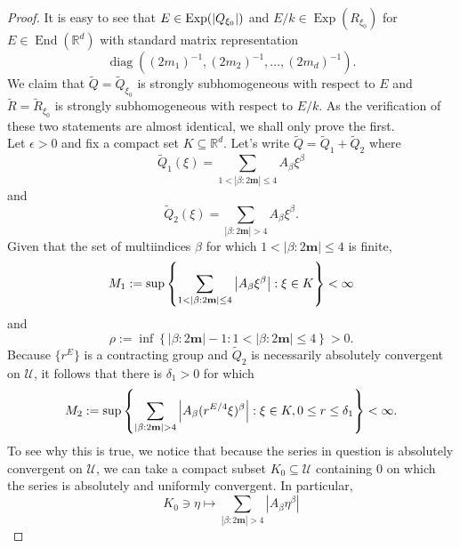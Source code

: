 \documentclass[11pt]{article}
\theoremstyle{remark}
\newcommand\End{\operatorname{End}} %
\newcommand\Exp{\operatorname{Exp}}
\newcommand\diag{\operatorname{diag}}
\begin{document}
\begin{proof}
It is easy to see that $E\in \Exp(\abs{Q_{\xi_0}})$ and $E/k\in\Exp(R_{\xi_0})$ for $E\in\End(\mathbb{R}^d)$ with standard matrix representation 
\begin{equation*}
\diag((2m_1)^{-1}, (2m_2)^{-1},\dots, (2m_d)^{-1}).
\end{equation*}
We claim that $\widetilde{Q}=\widetilde{Q}_{\xi_0}$ is strongly subhomogeneous with respect to $E$ and $\widetilde{R}=\widetilde{R}_{\xi_0}$ is strongly subhomogeneous with respect to $E/k$. As the verification of these two statements are almost identical, we shall only prove the first.\\

\noindent Let $\epsilon > 0$ and fix a compact set $K\subseteq\mathbb{R}^d$. Let's write $\widetilde{Q}=\widetilde{Q}_1+\widetilde{Q}_2$ where
\begin{equation*}
    \widetilde{Q}_1(\xi)=\sum_{1< |\beta:2\mathbf{m}|\leq 4}A_{\beta}\xi^\beta
\end{equation*}
and
\begin{equation*}
    \widetilde{Q}_2(\xi)=\sum_{ |\beta:2\mathbf{m}|>4}A_{\beta}\xi^\beta.
\end{equation*}
Given that the set of multiindices $\beta$ for which  $1<|\beta:2\mathbf{m}|\leq 4$ is finite, 
\begin{equation*}
    M_1:=\sup\left\{\sum_{1<|\beta:2\mathbf{m}|\leq 4} \abs{A_\beta\xi^\beta}:\xi\in K\right\}<\infty
\end{equation*}
and
\begin{equation*}
    \rho:=\inf\left\{|\beta:2\mathbf{m}|-1:1<|\beta:2\mathbf{m}|\leq 4\right\}>0.
\end{equation*}
Because $\{r^E\}$ is a contracting group and $\widetilde{Q}_2$ is necessarily absolutely convergent on $\mathcal{U}$, it follows that there is $\delta_1>0$ for which
\begin{equation*}
    M_2:=\sup\left\{\sum_{|\beta:2\mathbf{m}|>4}\abs{A_\beta(r^{E/4}\xi)^\beta}:\xi\in K, 0\leq r\leq\delta_1\right\}<\infty.
\end{equation*}
To see why this is true, we notice that because the series in question is absolutely convergent on $\mathcal{U}$, we can take a compact subset $K_0 \subseteq \mathcal{U}$ containing $0$ on which the series is absolutely and uniformly convergent. In particular, 
\begin{equation*}
    K_0 \ni \eta \mapsto \sum_{|\beta:2\mathbf{m}|>4}|A_{\beta}\eta^\beta|
\end{equation*}

\end{proof}
\end{document}

